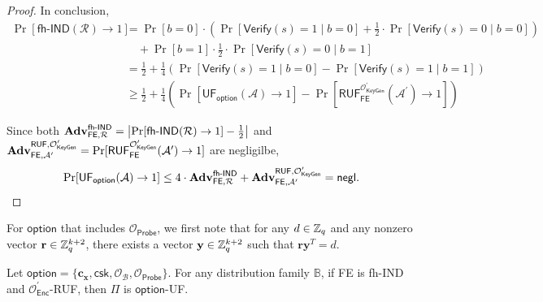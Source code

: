 \begin{proof}
In conclusion,
\begin{align*}
	\Pr[\textsf{fh-IND}(\mathcal{R}) \to 1] 
	&= \Pr[b = 0] \cdot \left( \Pr[\textsf{Verify}(s) = 1 \mid b = 0] + \frac{1}{2} \cdot \Pr[\textsf{Verify}(s) = 0 \mid b = 0] \right) \\
	&\quad + \Pr[b = 1] \cdot \frac{1}{2} \cdot \Pr[\textsf{Verify}(s) = 0 \mid b = 1] \\
	&= \frac{1}{2} + \frac{1}{4} \left( \Pr[\textsf{Verify}(s) = 1 \mid b = 0] - \Pr[\textsf{Verify}(s) = 1 \mid b = 1] \right) \\
	&\geq \frac{1}{2} + \frac{1}{4} \left( \Pr[\textsf{UF}_\textsf{option}(\mathcal{A}) \to 1] - \Pr[\textsf{RUF}^{\mathcal{O}^\prime_{\textsf{KeyGen}}}_{\textsf{FE}}(\mathcal{A}^\prime) \to 1 ] \right)
\end{align*}

\noindent Since both $\mathbf{Adv}_{\textsf{FE}, \mathcal{R}}^\textsf{fh-IND} = \left| \Pr[\textsf{fh-IND}(\mathcal{R}) \to 1] - \frac{1}{2} \right|$ and $\mathbf{Adv}_{\textsf{FE}, \mathcal{A}^\prime}^{\textsf{RUF},\mathcal{O}^\prime_{\textsf{KeyGen}}} = \Pr[\textsf{RUF}^{\mathcal{O}^\prime_{\textsf{KeyGen}}}_{\textsf{FE}}(\mathcal{A}^\prime) \to 1 ]$ are negligilbe,
\[
	\Pr[\textsf{UF}_\textsf{option}(\mathcal{A}) \to 1] \leq 4 \cdot \mathbf{Adv}_{\textsf{FE}, \mathcal{R}}^\textsf{fh-IND} + \mathbf{Adv}_{\textsf{FE}, \mathcal{A}^\prime}^{\textsf{RUF},\mathcal{O}^\prime_{\textsf{KeyGen}}} = \mathsf{negl}.
\]

\end{proof}


For $\textsf{option}$ that includes $\mathcal{O}_{\textsf{Probe}}$, we first note that for any $d \in \mathbb{Z}_q$ and any nonzero vector $\mathbf{r} \in \mathbb{Z}_q^{k+2}$, there exists a vector $\mathbf{y} \in \mathbb{Z}_q^{k+2}$ such that $\mathbf{r}\mathbf{y}^T = d$.

\begin{theorem}
\label{thm:fh-IPFE:ind-ruf-OB-Probe}
	Let $\textsf{option} = \{\mathbf{c_x}, \textsf{csk}, \mathcal{O}_\mathcal{B}, \mathcal{O}_\textsf{Probe}\}$. For any distribution family $\mathbb{B}$, if \textsf{FE} is fh-IND and $\mathcal{O}^\prime_{\textsf{Enc}}$-RUF, then $\Pi$ is $\textsf{option}$-UF. 
\end{theorem}


